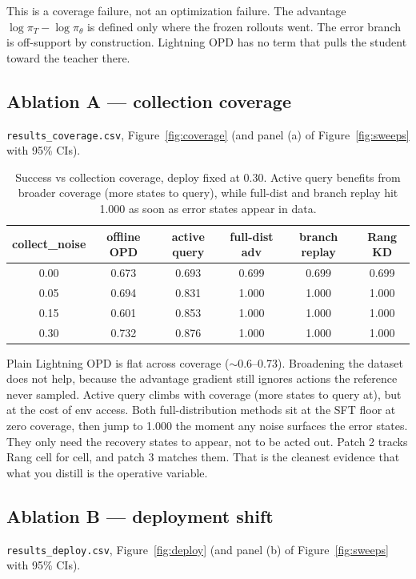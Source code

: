 \documentclass[11pt]{article}
\newcommand{\code}[1]{\texttt{#1}}
\begin{document}
This is a coverage failure, not an optimization failure. The advantage
$\log\pi_T - \log\pi_\theta$ is defined only where the frozen rollouts went. The
error branch is off-support by construction. Lightning OPD has no term that pulls
the student toward the teacher there.

\subsection{Ablation A --- collection coverage}
\code{results\_coverage.csv}, Figure~\ref{fig:coverage} (and panel (a) of
Figure~\ref{fig:sweeps} with 95\% CIs).

\begin{table}[h]
\centering
\small
\begin{tabular}{c c c c c c}
\toprule
\textbf{collect\_noise} & \textbf{offline OPD} & \textbf{active query} & \textbf{full-dist adv} & \textbf{branch replay} & \textbf{Rang KD} \\
\midrule
0.00 & 0.673 & 0.693 & 0.699 & 0.699 & 0.699 \\
0.05 & 0.694 & 0.831 & 1.000 & 1.000 & 1.000 \\
0.15 & 0.601 & 0.853 & 1.000 & 1.000 & 1.000 \\
0.30 & 0.732 & 0.876 & 1.000 & 1.000 & 1.000 \\
\bottomrule
\end{tabular}
\caption{Success vs collection coverage, deploy fixed at 0.30. Active query benefits
from broader coverage (more states to query), while full-dist and branch replay hit
1.000 as soon as error states appear in data.}
\label{tab:coverage}
\end{table}

Plain Lightning OPD is flat across coverage ($\sim$0.6--0.73). Broadening
the dataset does not help, because the advantage gradient still ignores actions the
reference never sampled. Active query climbs with coverage (more states to query at),
but at the cost of env access. Both full-distribution methods sit at the SFT floor at
zero coverage, then jump to 1.000 the moment any noise surfaces the error states.
They only need the recovery states to appear, not to be acted out. Patch 2
tracks Rang cell for cell, and patch 3 matches them. That is the cleanest evidence
that what you distill is the operative variable.

\subsection{Ablation B --- deployment shift}
\code{results\_deploy.csv}, Figure~\ref{fig:deploy} (and panel (b) of
Figure~\ref{fig:sweeps} with 95\% CIs).
\end{document}
